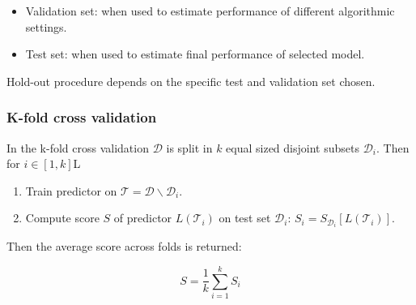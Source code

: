 		\begin{multicols}{2}
			\begin{itemize}
				\item Validation set: when used to estimate performance of different algorithmic settings.
				\item Test set: when used to estimate final performance of selected model.
			\end{itemize}
		\end{multicols}

		Hold-out procedure depends on the specific test and validation set chosen.

		\subsubsection{K-fold cross validation}
		In the k-fold cross validation $\mathcal{D}$ is split in $k$ equal sized disjoint subsets $\mathcal{D}_i$.
		Then for $i\in[1,k]$L
		
		\begin{multicols}{2}
			\begin{enumerate}
				\item Train predictor on $\mathcal{T} = \mathcal{D}\backslash\mathcal{D}_i$.
				\item Compute score $S$ of predictor $L(\mathcal{T}_i)$ on test set $\mathcal{D}_i$: $S_i = S_{\mathcal{D}_i}[L(\mathcal{T}_i)]$.
			\end{enumerate}
		\end{multicols}
		
		Then the average score across folds is returned:

		$$S = \frac{1}{k}\sum\limits_{i=1}^k S_i$$


